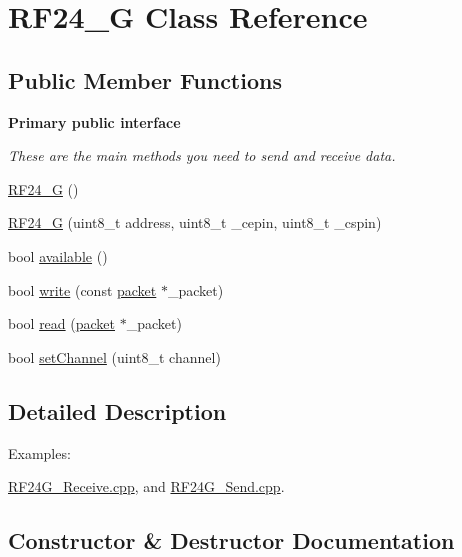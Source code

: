 \hypertarget{class_r_f24___g}{}\section{R\+F24\+\_\+G Class Reference}
\label{class_r_f24___g}
\subsection*{Public Member Functions}
\begin{Indent}{\bf Primary public interface}\par
{\em These are the main methods you need to send and receive data. }\begin{DoxyCompactItemize}
\item 
\hyperlink{class_r_f24___g_a6e389aa7e1856c4266e144bb4da3348a}{R\+F24\+\_\+G} ()
\item 
\hyperlink{class_r_f24___g_a014c20a25d290cff2476400487bb4f97}{R\+F24\+\_\+G} (uint8\+\_\+t address, uint8\+\_\+t \+\_\+cepin, uint8\+\_\+t \+\_\+cspin)
\item 
bool \hyperlink{class_r_f24___g_a7298349aea33bf12acdf242b7527302b}{available} ()
\item 
bool \hyperlink{class_r_f24___g_ac10bdf625f27df73183788a6358d2e71}{write} (const \hyperlink{classpacket}{packet} $\ast$\+\_\+packet)
\item 
bool \hyperlink{class_r_f24___g_a00d022e73f823087f1b2185545afbaa4}{read} (\hyperlink{classpacket}{packet} $\ast$\+\_\+packet)
\item 
bool \hyperlink{class_r_f24___g_a84472b6c06d38d0e04d783056d1b2698}{set\+Channel} (uint8\+\_\+t channel)
\end{DoxyCompactItemize}
\end{Indent}


\subsection{Detailed Description}
\begin{Desc}
\item[Examples\+: ]\par
\hyperlink{_r_f24_g__receive_8cpp-example}{R\+F24\+G\+\_\+\+Receive.\+cpp}, and \hyperlink{_r_f24_g__send_8cpp-example}{R\+F24\+G\+\_\+\+Send.\+cpp}.\end{Desc}


\subsection{Constructor \& Destructor Documentation}
\hypertarget{class_r_f24___g_a6e389aa7e1856c4266e144bb4da3348a}{}\label{class_r_f24___g_a6e389aa7e1856c4266e144bb4da3348a} 
